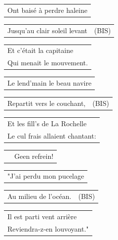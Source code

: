 \documentclass{article}
\begin{document}
\begin{flushleft}
\begin{tabularx}{\textwidth} {
    >{\raggedright\arraybackslash}X}
Ont baisé à perdre haleine\\
\end{tabularx}
\begin{tabularx}{\textwidth} {
    >{\raggedright\arraybackslash}X|c}
Jusqu’au clair soleil levant & (BIS)\\
\end{tabularx}
\begin{tabularx}{\textwidth} {
    >{\raggedright\arraybackslash}X}
Et c’était la capitaine \\
Qui menait le mouvement. \\
\end{tabularx}
\end{flushleft}
\begin{flushleft}
\begin{tabularx}{\textwidth} {
    >{\raggedright\arraybackslash}X}
Le lend’main le beau navire\\
\end{tabularx}
\begin{tabularx}{\textwidth} {
    >{\raggedright\arraybackslash}X|c}
Repartit vers le couchant, & (BIS)\\
\end{tabularx}
\begin{tabularx}{\textwidth} {
    >{\raggedright\arraybackslash}X}
Et les fill’s de La Rochelle \\
Le cul frais allaient chantant:\\
\end{tabularx}
\end{flushleft}
\begin{flushleft}
\begin{tabularx}{\textwidth} {
    c >{\raggedright\arraybackslash}X}
\hspace{5mm} & {\small Geen refrein!}
\end{tabularx}
\end{flushleft}
\begin{flushleft}
\begin{tabularx}{\textwidth} {
    >{\raggedright\arraybackslash}X}
"J’ai perdu mon pucelage\\
\end{tabularx}
\begin{tabularx}{\textwidth} {
    >{\raggedright\arraybackslash}X|c}
Au milieu de l’océan. & (BIS)\\
\end{tabularx}
\begin{tabularx}{\textwidth} {
    >{\raggedright\arraybackslash}X}
Il est parti vent arrière \\
Reviendra-z-en louvoyant." \\
\end{tabularx}
\end{flushleft}
\end{document}
